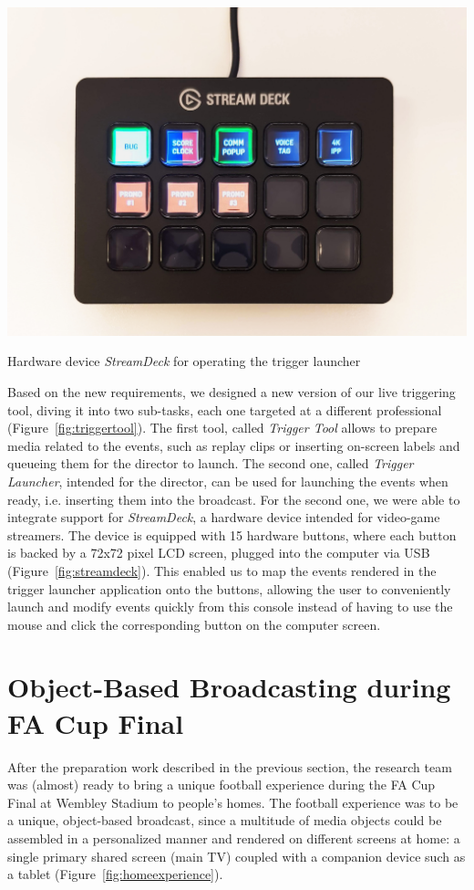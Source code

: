 \documentclass[sigchi-a, authorversion]{acmart}
\begin{document}
\begin{marginfigure}
    \includegraphics[width=\marginparwidth-10pt]{Figures/streamdeck.jpg}
    \caption{Hardware device \emph{StreamDeck} for operating the trigger launcher}
    \label{fig:streamdeck}
\end{marginfigure}

Based on the new requirements, we designed a new version of our live triggering
tool, diving it into two sub-tasks, each one targeted at a different professional
(Figure~\ref{fig:triggertool}). The first tool, called \emph{Trigger Tool} allows to prepare media
related to the events, such as replay clips or inserting on-screen labels and queueing
them for the director to launch. The second one, called \emph{Trigger Launcher}, intended for the director, can
be used for launching the events when ready, i.e. inserting them into the broadcast.
For the second one, we were able to integrate support for \emph{StreamDeck}, a 
hardware device intended for video-game streamers. The device is equipped with 15
hardware buttons, where each button is backed by a 72x72 pixel LCD screen, plugged into the computer via USB
(Figure~\ref{fig:streamdeck}). This enabled us to map the events rendered in the
trigger launcher application onto the buttons, allowing the user to conveniently launch and
modify events quickly from this console instead of having to use the mouse and
click the corresponding button on the computer screen.

\section{Object-Based Broadcasting during FA Cup Final}
After the preparation work described in the previous section, the research team
was (almost) ready to bring a unique football experience during the FA Cup Final
at Wembley Stadium to people's homes. The football experience was to be a unique, object-based broadcast, since a
multitude of media objects could be assembled in a personalized manner and rendered on
different screens at home: a single primary shared screen (main TV) coupled with
a companion device such as a tablet (Figure~\ref{fig:homeexperience}).
\end{document}
